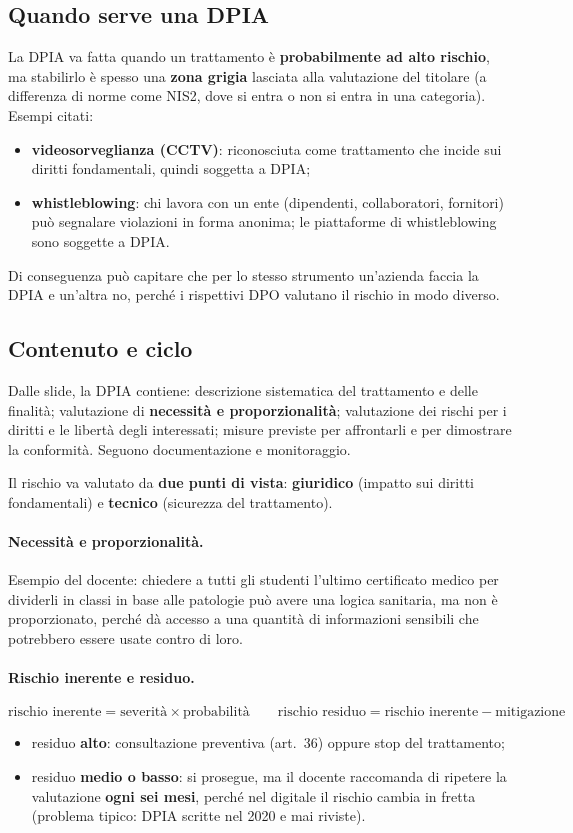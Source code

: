 \subsection{Quando serve una DPIA}
La DPIA va fatta quando un trattamento è \textbf{probabilmente ad alto rischio}, ma stabilirlo è
spesso una \textbf{zona grigia} lasciata alla valutazione del titolare (a differenza di norme come
NIS2, dove si entra o non si entra in una categoria). Esempi citati:
\begin{itemize}
  \item \textbf{videosorveglianza (CCTV)}: riconosciuta come trattamento che incide sui diritti
    fondamentali, quindi soggetta a DPIA;
  \item \textbf{whistleblowing}: chi lavora con un ente (dipendenti, collaboratori, fornitori) può
    segnalare violazioni in forma anonima; le piattaforme di whistleblowing sono soggette a DPIA.
\end{itemize}
Di conseguenza può capitare che per lo stesso strumento un'azienda faccia la DPIA e un'altra no,
perché i rispettivi DPO valutano il rischio in modo diverso.

\subsection{Contenuto e ciclo}
Dalle slide, la DPIA contiene: descrizione sistematica del trattamento e delle finalità;
valutazione di \textbf{necessità e proporzionalità}; valutazione dei rischi per i diritti e le libertà
degli interessati; misure previste per affrontarli e per dimostrare la conformità. Seguono
documentazione e monitoraggio.

Il rischio va valutato da \textbf{due punti di vista}: \textbf{giuridico} (impatto sui diritti
fondamentali) e \textbf{tecnico} (sicurezza del trattamento).

\paragraph{Necessità e proporzionalità.} Esempio del docente: chiedere a tutti gli studenti l'ultimo
certificato medico per dividerli in classi in base alle patologie può avere una logica sanitaria, ma
non è proporzionato, perché dà accesso a una quantità di informazioni sensibili che potrebbero essere
usate contro di loro.

\paragraph{Rischio inerente e residuo.}
\[
\text{rischio inerente} = \text{severità} \times \text{probabilità}
\qquad
\text{rischio residuo} = \text{rischio inerente} - \text{mitigazione}
\]
\begin{itemize}
  \item residuo \textbf{alto}: consultazione preventiva (art.~36) oppure stop del trattamento;
  \item residuo \textbf{medio o basso}: si prosegue, ma il docente raccomanda di ripetere la
    valutazione \textbf{ogni sei mesi}, perché nel digitale il rischio cambia in fretta (problema
    tipico: DPIA scritte nel 2020 e mai riviste).
\end{itemize}

